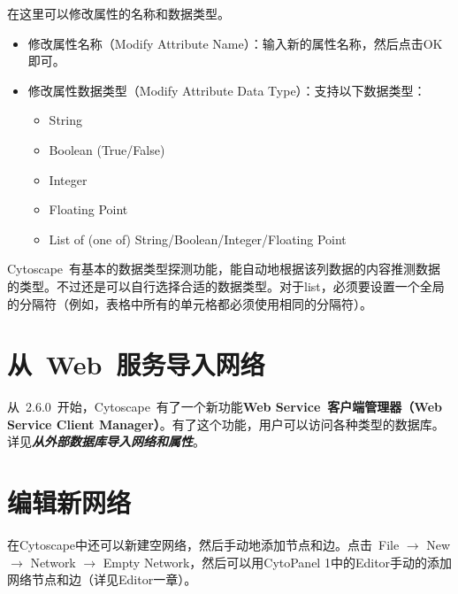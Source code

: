 在这里可以修改属性的名称和数据类型。
\begin{itemize}
\item 修改属性名称（Modify Attribute Name）：输入新的属性名称，然后点击OK即可。
\item 修改属性数据类型（Modify Attribute Data Type）：支持以下数据类型：
\begin{itemize}
\item String 
\item Boolean (True/False) 
\item Integer 
\item Floating Point 
\item List of (one of) String/Boolean/Integer/Floating Point 
\end{itemize}
\end{itemize}
Cytoscape~有基本的数据类型探测功能，能自动地根据该列数据的内容推测数据的类型。不过还是可以自行选择合适的数据类型。对于list，必须要设置一个全局的分隔符（例如，表格中所有的单元格都必须使用相同的分隔符）。

\section{从~Web~服务导入网络}
从~2.6.0~开始，Cytoscape~有了一个新功能\textbf{Web Service~客户端管理器（Web Service Client Manager）}。有了这个功能，用户可以访问各种类型的数据库。
详见\emph{\textbf{从外部数据库导入网络和属性}}。

\section{编辑新网络}
在Cytoscape中还可以新建空网络，然后手动地添加节点和边。点击~File $\rightarrow$ New $\rightarrow$ Network $\rightarrow$ Empty Network，然后可以用CytoPanel 1中的Editor手动的添加网络节点和边（详见Editor一章）。
